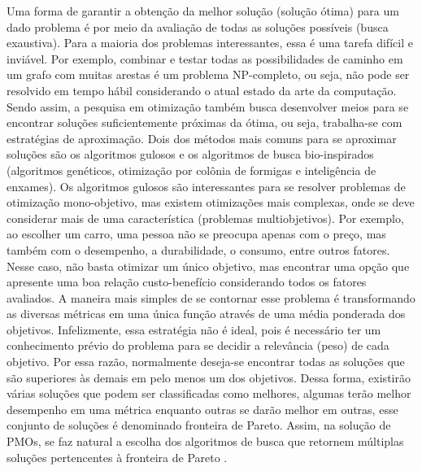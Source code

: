 Uma forma de garantir a obtenção da melhor solução (solução ótima) para um dado problema é por meio da avaliação de todas as soluções possíveis (busca exaustiva). Para a maioria dos problemas interessantes, essa é uma tarefa difícil e inviável. Por exemplo, combinar e testar todas as possibilidades de caminho em um grafo com muitas arestas é um problema NP-completo, ou seja, não pode ser resolvido em tempo hábil considerando o atual estado da arte da computação. Sendo assim, a pesquisa em otimização também busca desenvolver meios para se encontrar soluções suficientemente próximas da ótima, ou seja, trabalha-se com estratégias de aproximação. Dois dos métodos mais comuns para se aproximar soluções são os algoritmos gulosos e os algoritmos de busca bio-inspirados (algoritmos genéticos, otimização por colônia de formigas e inteligência de enxames). Os algoritmos gulosos são interessantes para se resolver problemas de otimização mono-objetivo, mas existem otimizações mais complexas, onde se deve considerar mais de uma característica (problemas multiobjetivos). Por exemplo, ao escolher um carro, uma pessoa não se preocupa apenas com o preço, mas também com o desempenho, a durabilidade, o consumo, entre outros fatores. Nesse caso, não basta otimizar um único objetivo, mas encontrar uma opção que apresente uma boa relação custo-benefício considerando todos os fatores avaliados. A maneira mais simples de se contornar esse problema é transformando as diversas métricas em uma única função através de uma média ponderada dos objetivos. Infelizmente, essa estratégia não é ideal, pois é necessário ter um conhecimento prévio do problema para se decidir a relevância (peso) de cada objetivo. Por essa razão, normalmente deseja-se encontrar todas as soluções que são superiores às demais em pelo menos um dos objetivos. Dessa forma, existirão várias soluções que podem ser classificadas como melhores, algumas terão melhor desempenho em uma métrica enquanto outras se darão melhor em outras, esse conjunto de soluções é denominado fronteira de Pareto. Assim, na solução de \acp{PMO}, se faz natural a escolha dos algoritmos de busca que retornem múltiplas soluções pertencentes à fronteira de Pareto \cite{Srinivas1994}.


